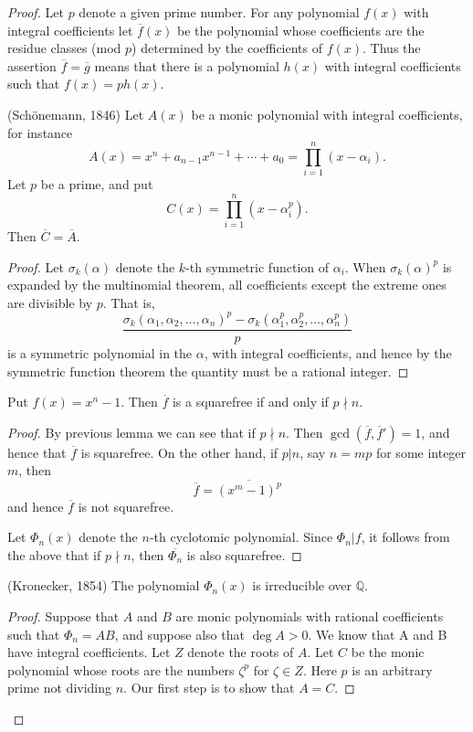 \begin{proof}
    Let $p$ denote a given prime number. For any polynomial $f(x)$ with integral coefficients let 
    $\overline{f}(x)$ be the polynomial whose coefficients are the residue classes (mod $p$) determined by the coefficients
    of $f(x)$. Thus the assertion $\overline{f} = \overline{g}$ means that there is a polynomial $h(x)$ with 
    integral coefficients such that $f(x) = ph(x)$.

    \begin{lemma}
        (Sch\"{o}nemann, 1846) Let $A(x)$ be a monic polynomial with integral coefficients, for instance
        \[
            A(x) = x^n + a_{n-1}x^{n-1} + \cdots + a_0 = \prod^{n}_{i = 1} (x - \alpha_i).
        \]
        Let $p$ be a prime, and put 
        \[
            C(x) = \prod_{i=1}^{n} (x - \alpha^p_i).
        \]
        Then $\overline{C} = \overline{A}$.
    \end{lemma}
    \begin{proof}
        Let $\sigma_k(\alpha)$ denote the $k$-th symmetric function of $\alpha_i$. When $\sigma_k(\alpha)^p$ is expanded 
        by the multinomial theorem, all coefficients except the extreme ones are divisible by $p$. That is,
        \[
            \frac{\sigma_k(\alpha_1, \alpha_2, \ldots, \alpha_n)^p - \sigma_k(\alpha^p_1, \alpha^p_2, \ldots, \alpha_n^p)}{p}
        \]
        is a symmetric polynomial in the $\alpha$, with integral coefficients, and hence by the symmetric function theorem the 
        quantity must be a rational integer.
    \end{proof}

    \begin{lemma}
        Put $f(x) = x^n - 1$. Then $\overline{f}$ is a squarefree if and only if $p \nmid n$.
    \end{lemma}
    \begin{proof}
        By previous lemma we can see that if $p \nmid n$. Then $\gcd(\overline{f}, \overline{f}') = 1$, and hence 
        that $\overline{f}$ is squarefree. On the other hand, if $p|n$, say $n = mp$ for some integer $m$, then 
        \[
            \overline{f} = \overline{(x^m - 1)^p}
        \]
        and hence $\overline{f}$ is not squarefree.

        Let $\Phi_n(x)$ denote the $n$-th cyclotomic polynomial. Since $\Phi_n | f$, it follows from the above 
        that if $p \nmid n$, then $\overline{\Phi_n}$ is also squarefree.
    \end{proof}

    \begin{theorem}
        (Kronecker, 1854) The polynomial $\Phi_n(x)$ is irreducible over $\mathbb{Q}$.
    \end{theorem}
    \begin{proof}
        Suppose that $A$ and $B$ are monic polynomials with rational coefficients such that
        $\Phi_n = AB$, and suppose also that $\deg A > 0$. We know that A and B
        have integral coefficients. Let $Z$ denote the roots of $A$. Let $C$ be the monic polynomial
        whose roots are the numbers $\zeta^p$ for $\zeta \in Z$. Here $p$ is an arbitrary prime not dividing $n$.
        Our first step is to show that $A = C$. 
        

\end{proof}
\end{proof}
